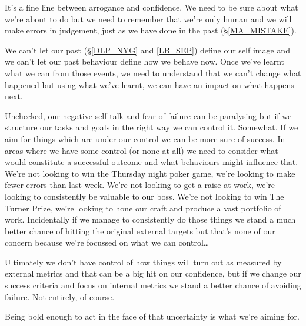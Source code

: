\cleardoublepage
{\small

It's a fine line between arrogance and confidence. We need to be sure about what we're about to do but we need to remember that we're only human and we will make errors in judgement, just as we have done in the past (\S \ref{MA_MISTAKE}). 

We can't let our past (\S \ref{DLP_NYG} and \ref{LB_SEP}) define our self image and we can't let our past behaviour define how we behave now. Once we've learnt what we can from those events, we need to understand that we can't change what happened but using what we've learnt, we can have an impact on what happens next.

Unchecked, our negative self talk and fear of failure can be paralysing but if we structure our tasks and goals in the right way we can control it. Somewhat. If we aim for things which are under our control we can be more sure of success. In areas where we have some control (or none at all) we need to consider what would constitute a successful outcome and what behaviours might influence that. We're not looking to win the Thursday night poker game, we're looking to make fewer errors than last week. We're not looking to get a raise at work, we're looking to consistently be valuable to our boss. We're not looking to win The Turner Prize, we're looking to hone our craft and produce a vast portfolio of work.
Incidentally if we manage to consistently do those things we stand a much better chance of hitting the original external targets but that's none of our concern because we're focussed on what we can control\ldots

Ultimately we don't have control of how things will turn out as measured by external metrics and that can be a big hit on our confidence, but if we change our success criteria and focus on internal metrics we stand a better chance of avoiding failure. Not entirely, of course.

Being bold enough to act in the face of that uncertainty is what we're aiming for.



}
